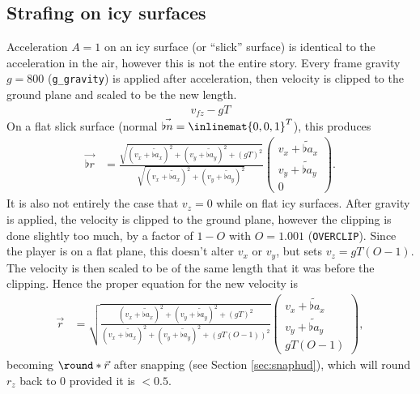 \subsection{Strafing on icy surfaces}
\label{sec:slick}
Acceleration $A = 1$ on an icy surface (or ``slick'' surface) is identical to the acceleration in the air, however this is not the entire story. Every frame gravity $g = 800$ (\texttt{g\_gravity}) is applied after acceleration, then velocity is clipped to the ground plane and scaled to be the new length.
\begin{align*}
v_{fz} - gT
\end{align*}
On a flat slick surface (normal $\vec{\flat{n}} = \inlinemat{0, 0, 1}^T$), this produces
\begin{align*}
\vec{\flat{r}} &= \frac{\sqrt{(v_x + \tilde{\flat{a}}_x)^2 + (v_y + \tilde{\flat{a}}_y)^2 + (gT)^2}}{\sqrt{(v_x + \tilde{\flat{a}}_x)^2 + (v_y + \tilde{\flat{a}}_y)^2}}\begin{pmatrix}
v_x + \tilde{\flat{a}}_x \\ v_y + \tilde{\flat{a}}_y \\ 0
\end{pmatrix}.
\end{align*}
It is also not entirely the case that $v_z = 0$ while on flat icy surfaces. After gravity is applied, the velocity is clipped to the ground plane, however the clipping is done slightly too much, by a factor of $1 - O$ with $O = 1.001$ (\texttt{OVERCLIP}). Since the player is on a flat plane, this doesn't alter $v_x$ or $v_y$, but sets $v_z = gT(O - 1)$. The velocity is then scaled to be of the same length that it was before the clipping.
Hence the proper equation for the new velocity is
\begin{align}
\label{eq:flat_slick_r}
\vec{r} &= \sqrt{\frac{(v_x + \tilde{\flat{a}}_x)^2 + (v_y + \tilde{\flat{a}}_y)^2 + (gT)^2}{(v_x + \tilde{\flat{a}}_x)^2 + (v_y + \tilde{\flat{a}}_y)^2 + (gT(O - 1))^2}}\begin{pmatrix}
v_x + \tilde{\flat{a}}_x \\ v_y + \tilde{\flat{a}}_y \\ gT(O - 1)
\end{pmatrix},
\end{align}
becoming $\round*{\vec{r}}$ after snapping (see Section \ref{sec:snaphud}), which will round $r_z$ back to $0$ provided it is $< 0.5$.

